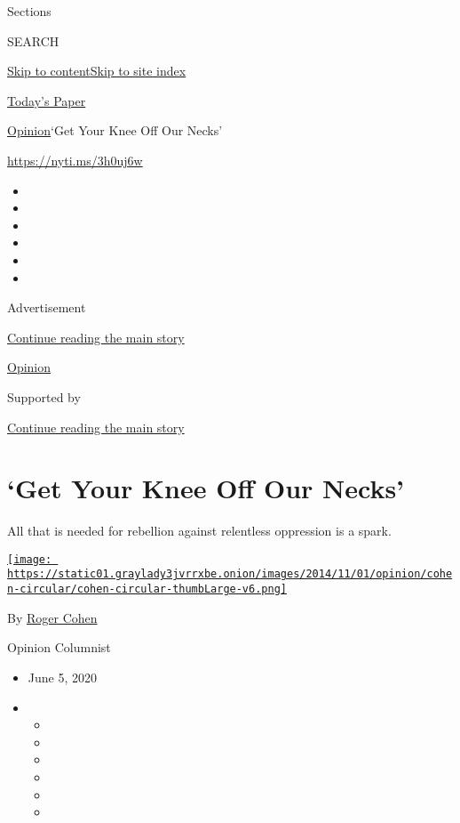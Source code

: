 Sections

SEARCH

\protect\hyperlink{site-content}{Skip to
content}\protect\hyperlink{site-index}{Skip to site index}

\href{https://myaccount.nytimes3xbfgragh.onion/auth/login?response_type=cookie\&client_id=vi}{}

\href{https://www.nytimes3xbfgragh.onion/section/todayspaper}{Today's
Paper}

\href{/section/opinion}{Opinion}\textbar{}`Get Your Knee Off Our Necks'

\url{https://nyti.ms/3h0uj6w}

\begin{itemize}
\item
\item
\item
\item
\item
\item
\end{itemize}

Advertisement

\protect\hyperlink{after-top}{Continue reading the main story}

\href{/section/opinion}{Opinion}

Supported by

\protect\hyperlink{after-sponsor}{Continue reading the main story}

\hypertarget{get-your-knee-off-our-necks}{%
\section{`Get Your Knee Off Our
Necks'}\label{get-your-knee-off-our-necks}}

All that is needed for rebellion against relentless oppression is a
spark.

\href{https://www.nytimes3xbfgragh.onion/by/roger-cohen}{\texttt{[image: https://static01.graylady3jvrrxbe.onion/images/2014/11/01/opinion/cohen-circular/cohen-circular-thumbLarge-v6.png]}}

By \href{https://www.nytimes3xbfgragh.onion/by/roger-cohen}{Roger Cohen}

Opinion Columnist

\begin{itemize}
\item
  June 5, 2020
\item
  \begin{itemize}
  \item
  \item
  \item
  \item
  \item
  \item
  \end{itemize}
\end{itemize}

